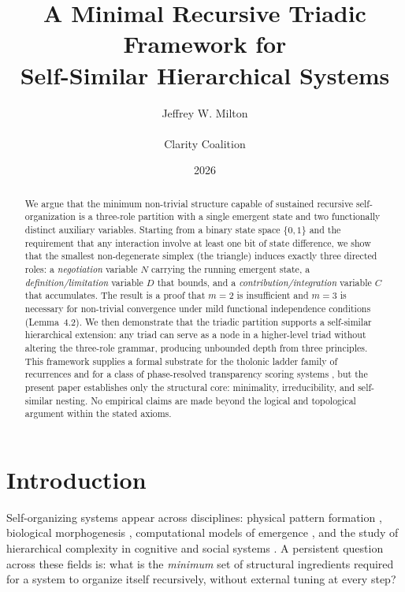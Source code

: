 \documentclass[12pt]{article}
\title{A Minimal Recursive Triadic Framework for\\Self-Similar Hierarchical Systems}
\author{Jeffrey W. Milton\\\\[4pt]\small Clarity Coalition}
\date{2026}
\theoremstyle{definition}
\theoremstyle{remark}
\begin{document}
\maketitle

\begin{abstract}
We argue that the minimum non-trivial structure capable of sustained recursive
self-organization is a three-role partition with a single emergent state and two
functionally distinct auxiliary variables.  Starting from a binary state space
$\{0,1\}$ and the requirement that any interaction involve at least one bit of state
difference, we show that the smallest non-degenerate simplex (the triangle) induces
exactly three directed roles: a \emph{negotiation} variable $N$ carrying the running
emergent state, a \emph{definition/limitation} variable $D$ that bounds, and a
\emph{contribution/integration} variable $C$ that accumulates.  The result is a proof
that $m = 2$ is insufficient and $m = 3$ is necessary for non-trivial convergence
under mild functional independence conditions (Lemma~4.2).  We then demonstrate that
the triadic partition supports a self-similar hierarchical extension: any triad can
serve as a node in a higher-level triad without altering the three-role grammar,
producing unbounded depth from three principles.  This framework supplies a formal
substrate for the tholonic ladder family of recurrences \cite{Mil24} and for a class
of phase-resolved transparency scoring systems \cite{Mil24}, but the present paper
establishes only the structural core: minimality, irreducibility, and self-similar
nesting.  No empirical claims are made beyond the logical and topological argument
within the stated axioms.
\end{abstract}

\tableofcontents

\section{Introduction}\label{sec:intro}

Self-organizing systems appear across disciplines: physical pattern formation \cite{CH93},
biological morphogenesis \cite{Tur52}, computational models of emergence
\cite{Lan90,Wol02}, and the study of hierarchical complexity in cognitive and social
systems \cite{JLM01}.  A persistent question across these fields is: what is the
\emph{minimum} set of structural ingredients required for a system to organize itself
recursively, without external tuning at every step?
\end{document}
